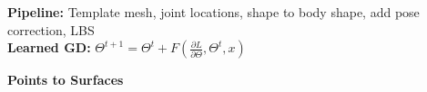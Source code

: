 \textbf{Pipeline:} Template mesh, joint locations, shape to body shape, add pose correction, LBS\\

\textbf{Learned GD:} $\Theta^{t+1} = \Theta^t + F(\frac{\partial L}{\partial \Theta}, \Theta^t, x)$\\

\textbf{Points to Surfaces}\\

